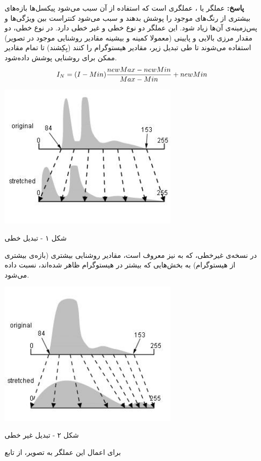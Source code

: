 \documentclass[12pt,a4paper]{article}
\theoremstyle{definition}
\theoremstyle{theorem}
\theoremstyle{definition}
\begin{document}
\textbf{پاسخ:}
عملگر 
یا
، عملگری است که استفاده از آن سبب می‌شود پیکسل‌ها بازه‌های بیشتری از رنگ‌های موجود را پوشش بدهند و سبب می‌شود کنتراست بین ویژگی‌ها و پس‌زمینه‌ی آن‌ها زیاد شود. این عملگر دو نوع خطی و غیر خطی دارد. در نوع خطی،‌ دو مقدار مرزی بالایی و پایینی (معمولا کمینه و بیشینه مقادیر روشنایی موجود در تصویر) استفاده می‌شوند تا طی تبدیل زیر، مقادیر هیستوگرام را
کنند (بِکِشند) تا تمام مقادیر ممکن برای روشنایی پوشش داده‌شود. 
\\

\vspace{0.3cm}
\begin{equation}
\label{linear}
I_N = (I - Min ) {{newMax - newMin} \over {Max - Min}} + newMin
\end{equation}


\centerline{\vspace{-1cm} \includegraphics[height=7cm]{linearstretch.jpg}}
\centerline{\vspace{0.6cm}
شکل ۱ - تبدیل خطی
}
در نسخه‌ی غیرخطی، که به
نیز معروف است، مقادیر روشنایی بیشتری (بازه‌ی بیشتری از هیستوگرام) به بخش‌هایی که بیشتر در هیستوگرام ظاهر شده‌اند، نسبت داده می‌شود. 
\\ 

\centerline{\vspace{-0.5cm} \includegraphics[height=7cm]{equalizedstretch.jpg}}
\centerline{\vspace{0.6cm}
شکل ۲ - تبدیل غیر خطی
}
برای اعمال این عملگر به تصویر، از تابع
\end{document}
